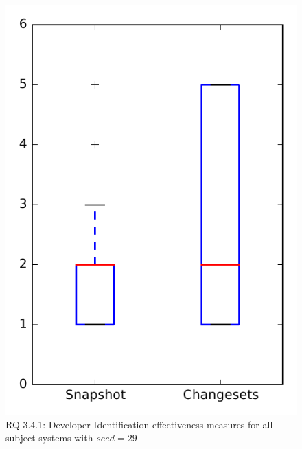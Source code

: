 
\begin{figure}
\centering
\includegraphics[height=0.4\textheight]{figures/dit_seed/rq1_overview_29}
\caption{RQ 3.4.1: Developer Identification effectiveness measures for all subject systems with $seed=29$}
\label{fig:dit_seed:rq1:overview}
\end{figure}
